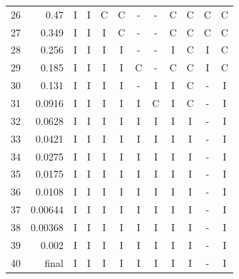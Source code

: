 \begin{tabular}{rrcccccccccc}
26 & 0.47 & I & I & C & C & - & - & C & C & C & C \\
27 & 0.349 & I & I & I & C & - & - & C & C & C & C \\
28 & 0.256 & I & I & I & I & - & - & I & C & I & C \\
29 & 0.185 & I & I & I & I & C & - & C & C & I & C \\
30 & 0.131 & I & I & I & I & - & I & I & C & - & I \\
31 & 0.0916 & I & I & I & I & I & C & I & C & - & I \\
32 & 0.0628 & I & I & I & I & I & I & I & I & - & I \\
33 & 0.0421 & I & I & I & I & I & I & I & I & - & I \\
34 & 0.0275 & I & I & I & I & I & I & I & I & - & I \\
35 & 0.0175 & I & I & I & I & I & I & I & I & - & I \\
36 & 0.0108 & I & I & I & I & I & I & I & I & - & I \\
37 & 0.00644 & I & I & I & I & I & I & I & I & - & I \\
38 & 0.00368 & I & I & I & I & I & I & I & I & - & I \\
39 & 0.002 & I & I & I & I & I & I & I & I & - & I \\
40 & final & I & I & I & I & I & I & I & I & - & I \\
\bottomrule
\end{tabular}
